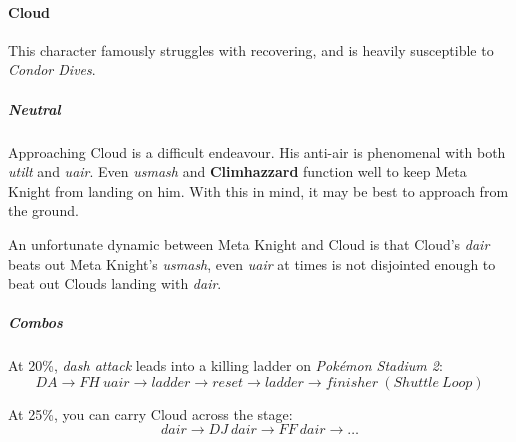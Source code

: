 \paragraph{Cloud}

This character famously struggles with recovering, and is heavily susceptible to \textit{Condor Dives}.

\subparagraph{Neutral}
Approaching Cloud is a difficult endeavour. His anti-air is phenomenal with both \textit{utilt} and \textit{uair}. Even \textit{usmash} and \textbf{Climhazzard} function well to keep Meta Knight from landing on him. With this in mind, it may be best to approach from the ground.

An unfortunate dynamic between Meta Knight and Cloud is that Cloud's \textit{dair} beats out Meta Knight's \textit{usmash}, even \textit{uair} at times is not disjointed enough to beat out Clouds landing with \textit{dair}.

\subparagraph{Combos}
At 20\%, \textit{dash attack} leads into a killing ladder on \textit{Pokémon Stadium 2}:
\[
	DA \to FH\ uair \to ladder \to reset \to ladder \to finisher\ (Shuttle \ Loop)
\]

At 25\%, you can carry Cloud across the stage:
\[
	dair \to DJ\ dair \to FF\ dair \to \hdots
\]